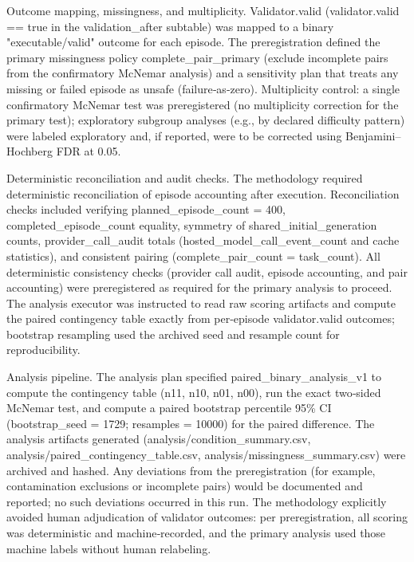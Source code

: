 \documentclass[conference]{IEEEtran}
\begin{document}
Outcome mapping, missingness, and multiplicity. Validator.valid (validator.valid == true in the validation\_after subtable) was mapped to a binary "executable/valid" outcome for each episode. The preregistration defined the primary missingness policy complete\_pair\_primary (exclude incomplete pairs from the confirmatory McNemar analysis) and a sensitivity plan that treats any missing or failed episode as unsafe (failure‑as‑zero). Multiplicity control: a single confirmatory McNemar test was preregistered (no multiplicity correction for the primary test); exploratory subgroup analyses (e.g., by declared difficulty pattern) were labeled exploratory and, if reported, were to be corrected using Benjamini--Hochberg FDR at 0.05.

Deterministic reconciliation and audit checks. The methodology required deterministic reconciliation of episode accounting after execution. Reconciliation checks included verifying planned\_episode\_count = 400, completed\_episode\_count equality, symmetry of shared\_initial\_generation counts, provider\_call\_audit totals (hosted\_model\_call\_event\_count and cache statistics), and consistent pairing (complete\_pair\_count = task\_count). All deterministic consistency checks (provider call audit, episode accounting, and pair accounting) were preregistered as required for the primary analysis to proceed. The analysis executor was instructed to read raw scoring artifacts and compute the paired contingency table exactly from per‑episode validator.valid outcomes; bootstrap resampling used the archived seed and resample count for reproducibility.

Analysis pipeline. The analysis plan specified paired\_binary\_analysis\_v1 to compute the contingency table (n11, n10, n01, n00), run the exact two‑sided McNemar test, and compute a paired bootstrap percentile 95\% CI (bootstrap\_seed = 1729; resamples = 10000) for the paired difference. The analysis artifacts generated (analysis/condition\_summary.csv, analysis/paired\_contingency\_table.csv, analysis/missingness\_summary.csv) were archived and hashed. Any deviations from the preregistration (for example, contamination exclusions or incomplete pairs) would be documented and reported; no such deviations occurred in this run. The methodology explicitly avoided human adjudication of validator outcomes: per preregistration, all scoring was deterministic and machine‑recorded, and the primary analysis used those machine labels without human relabeling.
\end{document}
